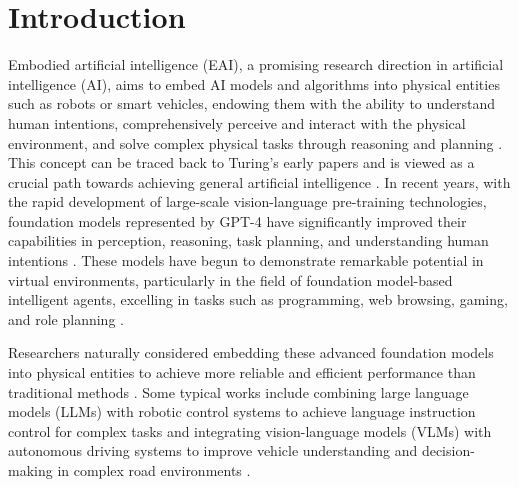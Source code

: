 \section{Introduction}\label{sec:intro}




Embodied artificial intelligence (EAI), a promising research direction in artificial intelligence (AI), aims to embed AI models and algorithms into physical entities such as robots or smart vehicles, endowing them with the ability to understand human intentions, comprehensively perceive and interact with the physical environment, and solve complex physical tasks through reasoning and planning \cite{ almalioglu2022deep, karoly2020deep, gupta2021embodied,grigorescu2020survey,kaufmann2023champion}. 
This concept can be traced back to Turing's early papers and is viewed as a crucial path towards achieving general artificial intelligence \cite{Turing1950-TURCMA}. 
In recent years, with the rapid development of large-scale vision-language pre-training technologies, foundation models represented by GPT-4\cite{achiam2023gpt} have significantly improved their capabilities in perception, reasoning, task planning, and understanding human intentions \cite{wei2022emergent,huang-chang-2023-towards,zhao2024large}. 
These models have begun to demonstrate remarkable potential in virtual environments, particularly in the field of foundation model-based intelligent agents, excelling in tasks such as programming, web browsing, gaming, and role planning \cite{gurreal, zhangplanning,wangvoyager,shanahan2023role}.

Researchers naturally considered embedding these advanced foundation models into physical entities to achieve more reliable and efficient performance than traditional methods \cite{brohan2023can,xie2023chatgpt,cui2024survey,cui2023drivellm,rey2024leveraging}. Some typical works include combining large language models (LLMs) with robotic control systems to achieve language instruction control for complex tasks \cite{brohan2023can,xie2023chatgpt} and integrating vision-language models (VLMs) with autonomous driving systems to improve vehicle understanding and decision-making in complex road environments \cite{cui2024survey,cui2023drivellm}.

